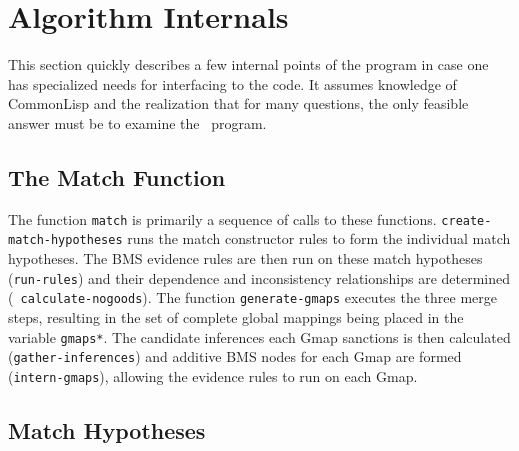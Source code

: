 \section{Algorithm Internals}

This section quickly describes a few internal points of the program in case
one has specialized needs for interfacing to the code. It assumes knowledge
of CommonLisp and the realization that for many questions, the only feasible
answer must be to examine the \SME\ program.

\subsection{The Match Function}

\indent
{}

The function {\tt match} is primarily a sequence of calls to these
functions. {\tt create-match-hypotheses} runs the match constructor
rules to form the individual match hypotheses. The BMS evidence rules are
then run on these match hypotheses ({\tt run-rules}) and their
dependence and inconsistency relationships are determined ({\tt
calculate-nogoods}). The function {\tt generate-gmaps} executes the three
merge steps, resulting in the set of complete global mappings being placed
in the variable {\tt *gmaps*}. The candidate inferences each Gmap
sanctions is then calculated ({\tt gather-inferences}) and additive BMS
nodes for each Gmap are formed ({\tt intern-gmaps}), allowing the evidence
rules to run on each Gmap.

\subsection{Match Hypotheses}


